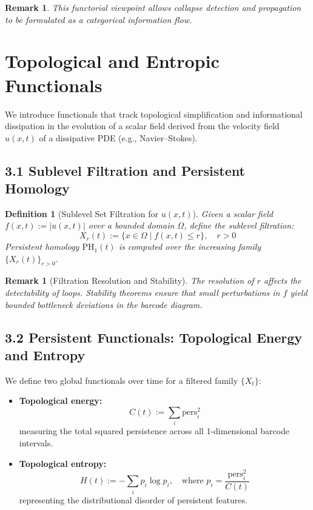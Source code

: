 \documentclass[11pt]{article}
\newtheorem{definition}[theorem]{Definition}
\newtheorem{remark}[theorem]{Remark}
\begin{document}
\begin{remark}
This functorial viewpoint allows collapse detection and propagation to be formulated as a categorical information flow.
\end{remark}





\section{Topological and Entropic Functionals}

We introduce functionals that track topological simplification and informational dissipation in the evolution of a scalar field derived from the velocity field $u(x,t)$ of a dissipative PDE (e.g., Navier--Stokes).

\subsection{3.1 Sublevel Filtration and Persistent Homology}

\begin{definition}[Sublevel Set Filtration for $u(x,t)$]
Given a scalar field $f(x,t) := |u(x,t)|$ over a bounded domain $\Omega$, define the sublevel filtration:
\[
X_r(t) := \{ x \in \Omega \mid f(x,t) \leq r \}, \quad r > 0
\]
Persistent homology $\mathrm{PH}_1(t)$ is computed over the increasing family $\{ X_r(t) \}_{r > 0}$.
\end{definition}

\begin{remark}[Filtration Resolution and Stability]
The resolution of $r$ affects the detectability of loops. Stability theorems ensure that small perturbations in $f$ yield bounded bottleneck deviations in the barcode diagram.
\end{remark}

\subsection{3.2 Persistent Functionals: Topological Energy and Entropy}

We define two global functionals over time for a filtered family $\{X_t\}$:
\begin{itemize}
  \item \textbf{Topological energy:} 
  \[
  C(t) := \sum_i \mathrm{pers}_i^2
  \]
  measuring the total squared persistence across all 1-dimensional barcode intervals.
  
  \item \textbf{Topological entropy:}
  \[
  H(t) := -\sum_i p_i \log p_i, \quad \text{where } p_i = \frac{\mathrm{pers}_i^2}{C(t)}
  \]
  representing the distributional disorder of persistent features.
\end{itemize}
\end{document}
